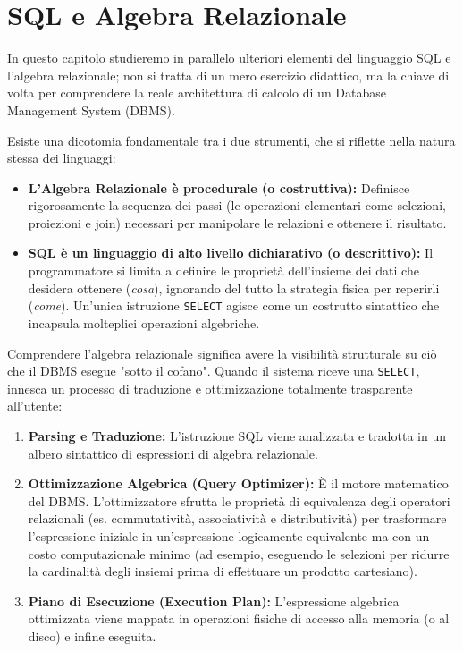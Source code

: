 \chapter{SQL e Algebra Relazionale}

In questo capitolo studieremo in parallelo ulteriori elementi del linguaggio SQL e l'algebra relazionale; non si tratta di un mero esercizio didattico, ma la chiave di volta per comprendere la reale architettura di calcolo di un Database Management System (DBMS). 

Esiste una dicotomia fondamentale tra i due strumenti, che si riflette nella natura stessa dei linguaggi:
\begin{itemize}
    \item \textbf{L'Algebra Relazionale è procedurale (o costruttiva):} Definisce rigorosamente la sequenza dei passi (le operazioni elementari come selezioni, proiezioni e join) necessari per manipolare le relazioni e ottenere il risultato.
    \item \textbf{SQL è un linguaggio di alto livello dichiarativo (o descrittivo):} Il programmatore si limita a definire le proprietà dell'insieme dei dati che desidera ottenere (\textit{cosa}), ignorando del tutto la strategia fisica per reperirli (\textit{come}). Un'unica istruzione \texttt{SELECT} agisce come un costrutto sintattico che incapsula molteplici operazioni algebriche.
\end{itemize}

\medskip

Comprendere l'algebra relazionale significa avere la visibilità strutturale su ciò che il DBMS esegue "sotto il cofano". Quando il sistema riceve una \texttt{SELECT}, innesca un processo di traduzione e ottimizzazione totalmente trasparente all'utente:
\begin{enumerate}
    \item \textbf{Parsing e Traduzione:} L'istruzione SQL viene analizzata e tradotta in un albero sintattico di espressioni di algebra relazionale.
    \item \textbf{Ottimizzazione Algebrica (Query Optimizer):} È il motore matematico del DBMS. L'ottimizzatore sfrutta le proprietà di equivalenza degli operatori relazionali (es. commutatività, associatività e distributività) per trasformare l'espressione iniziale in un'espressione logicamente equivalente ma con un costo computazionale minimo (ad esempio, eseguendo le selezioni per ridurre la cardinalità degli insiemi prima di effettuare un prodotto cartesiano).
    \item \textbf{Piano di Esecuzione (Execution Plan):} L'espressione algebrica ottimizzata viene mappata in operazioni fisiche di accesso alla memoria (o al disco) e infine eseguita.
\end{enumerate}

